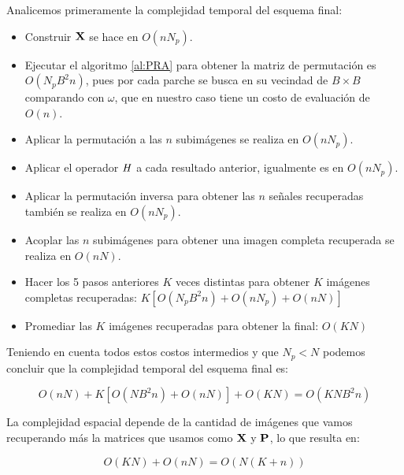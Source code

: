 Analicemos primeramente la complejidad temporal del esquema final:

\begin{itemize}
	\item Construir $\X$ se hace en $O(nN_p)$.
	\item Ejecutar el algoritmo \ref{al:PRA} para obtener la matriz de permutaci\'on es $O(N_pB^2n)$, pues por cada parche se busca en su vecindad de $B \times B$ comparando con $\omega$, que en nuestro caso tiene un costo de evaluaci\'on de $O(n)$.
	\item Aplicar la permutaci\'on a las $n$ subim\'agenes se realiza en $O(nN_p)$.
	\item Aplicar el operador $\H$ a cada resultado anterior, igualmente es en $O(nN_p)$.
	\item Aplicar la permutaci\'on inversa para obtener las $n$ señales recuperadas también se realiza en $O(nN_p)$.
	\item Acoplar las $n$ subim\'agenes para obtener una imagen completa recuperada se realiza en $O(nN)$.
	\item Hacer los 5 pasos anteriores $K$ veces distintas para obtener $K$ im\'agenes completas recuperadas: $K[O(N_pB^2n) + O(nN_p) + O(nN)]$
	\item Promediar las $K$ im\'agenes recuperadas para obtener la final: $O(KN)$
\end{itemize}

Teniendo en cuenta todos estos costos intermedios y que $N_p < N$ podemos concluir que la complejidad temporal del esquema final es:

\begin{equation}
	O(nN) + K[O(NB^2n) + O(nN)] + O(KN) = \boxed{O(KNB^2n)}
	\label{eq:temporal_complexity}
\end{equation}

La complejidad espacial depende de la cantidad de im\'agenes que vamos recuperando m\'as la matrices que usamos como $\X$ y $\P$, lo que resulta en:

\begin{equation}
	O(KN) + O(nN) = \boxed{O(N(K + n))}
	\label{eq:spacial_complexity}
\end{equation}